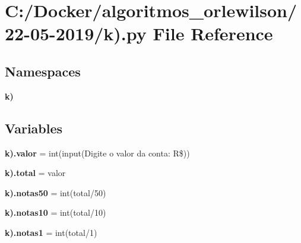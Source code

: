 \section{C\+:/\+Docker/algoritmos\+\_\+orlewilson/22-\/05-\/2019/k).py File Reference}
\label{k_08_8py}
\subsection*{Namespaces}
\begin{DoxyCompactItemize}
\item 
 \textbf{ k)}
\end{DoxyCompactItemize}
\subsection*{Variables}
\begin{DoxyCompactItemize}
\item 
\textbf{ k).\+valor} = int(input(\textquotesingle{}Digite o valor da conta\+: R\$\textquotesingle{}))
\item 
\textbf{ k).\+total} = valor
\item 
\textbf{ k).\+notas50} = int(total/50)
\item 
\textbf{ k).\+notas10} = int(total/10)
\item 
\textbf{ k).\+notas1} = int(total/1)
\end{DoxyCompactItemize}
